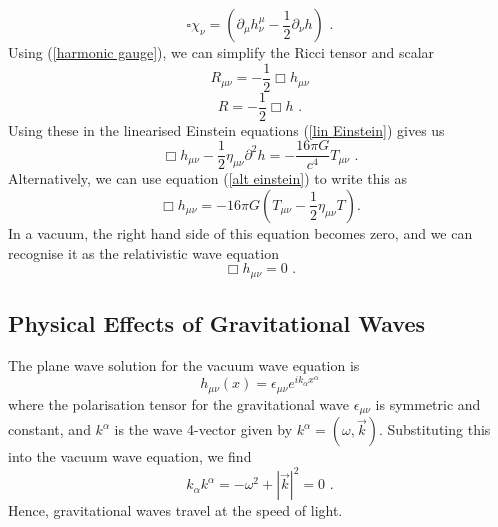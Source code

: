\documentclass[11pt]{cuthesis}
\newcommand{\mn}{_{\mu\nu}}
\newcommand{\fs}{\text{ .}}
\begin{document}
\begin{equation} \label{harmonic chi}
\square \chi_\nu = (\partial_\mu h^\mu_\nu - \frac{1}{2}\partial_\nu h) \fs
\end{equation}
Using (\ref{harmonic gauge}), we can simplify the Ricci tensor and scalar
\begin{equation}
R\mn = -\frac{1}{2}\Box h\mn
\end{equation}
\begin{equation}
R=-\frac{1}{2}\Box h \fs
\end{equation}
Using these in the linearised Einstein equations (\ref{lin Einstein}) gives us
\begin{equation} \label{lin einstein eqn}
\Box h\mn - \frac{1}{2}\eta\mn\partial^2 h =-\frac{16\pi G}{c^4}T\mn \fs
\end{equation}
Alternatively, we can use equation (\ref{alt einstein}) to write this as
\begin{equation}
\Box h\mn = -16\pi G \left( T\mn -\frac{1}{2} \eta\mn T \right). 
\end{equation}
In a vacuum, the right hand side of this equation becomes zero, and we can recognise it as the relativistic wave equation
 \begin{equation}
\Box h\mn = 0 \fs
\end{equation}

\subsection{Physical Effects of Gravitational Waves} \label{sec:GW effects}
The plane wave solution for the vacuum wave equation is
\begin{equation} \label{plane wave}
h\mn (x) = \epsilon\mn e^{ik_\alpha x^\alpha} 
\end{equation}
where the polarisation tensor for the gravitational wave $\epsilon\mn$ is symmetric and constant, and $k^\alpha$ is the wave 4-vector given by $k^\alpha = (\omega,\vec{k})$. Substituting this into the vacuum wave equation, we find 
\begin{equation}
k_\alpha k^\alpha = -\omega^2 + |\vec{k}|^2 =0 \fs
\end{equation}
Hence, gravitational waves travel at the speed of light. 
\end{document}
